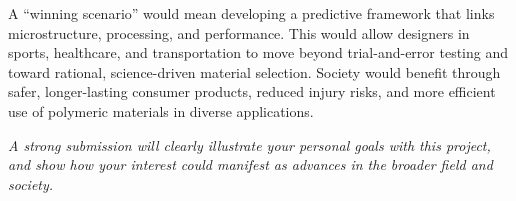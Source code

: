 \begin{enumerate}
A “winning scenario” would mean developing a predictive framework that links microstructure, processing, and performance. This would allow designers in sports, healthcare, and transportation to move beyond trial-and-error testing and toward rational, science-driven material selection. Society would benefit through safer, longer-lasting consumer products, reduced injury risks, and more efficient use of polymeric materials in diverse applications.
\end{enumerate}

\emph{A strong submission will clearly illustrate your personal goals with this project, and show how your interest could manifest as advances in the broader field and society.}





